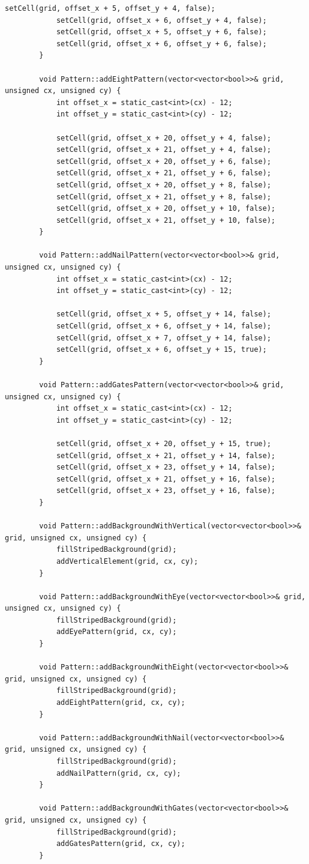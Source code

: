 \documentclass[14pt,a4paper]{extarticle}
\theoremstyle{plain}
\begin{document}
\begin{lstlisting}[title=pattern.cpp, gobble=16, breaklines=true, showspaces=false, showtabs=false, breakatwhitespace=true]
			setCell(grid, offset_x + 5, offset_y + 4, false);
			setCell(grid, offset_x + 6, offset_y + 4, false);
			setCell(grid, offset_x + 5, offset_y + 6, false);
			setCell(grid, offset_x + 6, offset_y + 6, false);
		}
		
		void Pattern::addEightPattern(vector<vector<bool>>& grid, unsigned cx, unsigned cy) {
			int offset_x = static_cast<int>(cx) - 12;
			int offset_y = static_cast<int>(cy) - 12;
			
			setCell(grid, offset_x + 20, offset_y + 4, false);
			setCell(grid, offset_x + 21, offset_y + 4, false);
			setCell(grid, offset_x + 20, offset_y + 6, false);
			setCell(grid, offset_x + 21, offset_y + 6, false);
			setCell(grid, offset_x + 20, offset_y + 8, false);
			setCell(grid, offset_x + 21, offset_y + 8, false);
			setCell(grid, offset_x + 20, offset_y + 10, false);
			setCell(grid, offset_x + 21, offset_y + 10, false);
		}
		
		void Pattern::addNailPattern(vector<vector<bool>>& grid, unsigned cx, unsigned cy) {
			int offset_x = static_cast<int>(cx) - 12;
			int offset_y = static_cast<int>(cy) - 12;
			
			setCell(grid, offset_x + 5, offset_y + 14, false);
			setCell(grid, offset_x + 6, offset_y + 14, false);
			setCell(grid, offset_x + 7, offset_y + 14, false);
			setCell(grid, offset_x + 6, offset_y + 15, true);
		}
		
		void Pattern::addGatesPattern(vector<vector<bool>>& grid, unsigned cx, unsigned cy) {
			int offset_x = static_cast<int>(cx) - 12;
			int offset_y = static_cast<int>(cy) - 12;
			
			setCell(grid, offset_x + 20, offset_y + 15, true);
			setCell(grid, offset_x + 21, offset_y + 14, false);
			setCell(grid, offset_x + 23, offset_y + 14, false);
			setCell(grid, offset_x + 21, offset_y + 16, false);
			setCell(grid, offset_x + 23, offset_y + 16, false);
		}
		
		void Pattern::addBackgroundWithVertical(vector<vector<bool>>& grid, unsigned cx, unsigned cy) {
			fillStripedBackground(grid);
			addVerticalElement(grid, cx, cy);
		}
		
		void Pattern::addBackgroundWithEye(vector<vector<bool>>& grid, unsigned cx, unsigned cy) {
			fillStripedBackground(grid);
			addEyePattern(grid, cx, cy);
		}
		
		void Pattern::addBackgroundWithEight(vector<vector<bool>>& grid, unsigned cx, unsigned cy) {
			fillStripedBackground(grid);
			addEightPattern(grid, cx, cy);
		}
		
		void Pattern::addBackgroundWithNail(vector<vector<bool>>& grid, unsigned cx, unsigned cy) {
			fillStripedBackground(grid);
			addNailPattern(grid, cx, cy);
		}
		
		void Pattern::addBackgroundWithGates(vector<vector<bool>>& grid, unsigned cx, unsigned cy) {
			fillStripedBackground(grid);
			addGatesPattern(grid, cx, cy);
		}
	\end{lstlisting}
	
\end{document}
